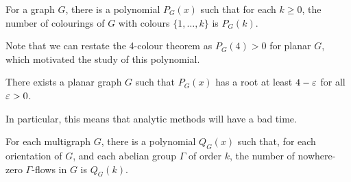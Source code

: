 \documentclass[main.tex]{subfiles}
\begin{document}
\begin{theorem}
  For a graph $G$, there is a polynomial $P_G(x)$ such that for each $k\geq 0$,
  the number of colourings of $G$ with colours $\{1,\ldots,k\}$ is $P_G(k)$.
\end{theorem}
Note that we can restate the 4-colour theorem as $P_G(4) > 0$ for planar $G$,
which motivated the study of this polynomial.
\begin{theorem}
  There exists a planar graph $G$ such that $P_G(x)$ has a root at least
  $4 - \varepsilon$ for all $\varepsilon > 0$.
\end{theorem}
In particular, this means that analytic methods will have a bad time.

\begin{theorem}[Tutte]
  For each multigraph $G$, there is a polynomial $Q_G(x)$ such that, for each
  orientation of $G$, and each abelian group $\Gamma$ of order $k$, the number
  of nowhere-zero $\Gamma$-flows in $G$ is $Q_G(k)$.
\end{theorem}
\end{document}
